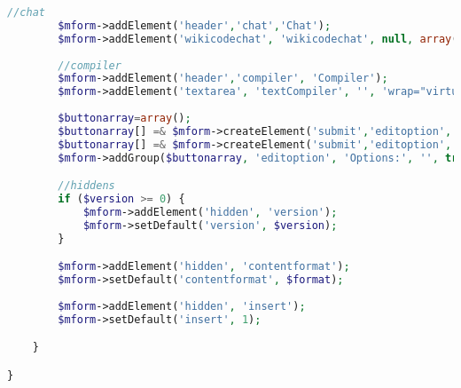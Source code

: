 \begin{lstlisting}[language=PHP]
		//chat
		$mform->addElement('header','chat','Chat');
		$mform->addElement('wikicodechat', 'wikicodechat', null, array('itemid'=>$fileitemid));
		
		//compiler
		$mform->addElement('header','compiler', 'Compiler');
		$mform->addElement('textarea', 'textCompiler', '', 'wrap="virtual" rows="3" cols="100" readonly="readonly" ');
		
		$buttonarray=array();
		$buttonarray[] =& $mform->createElement('submit','editoption','Compile', array('id' => 'compile'));
		$buttonarray[] =& $mform->createElement('submit','editoption','Download', array('id' => 'compile'));
		$mform->addGroup($buttonarray, 'editoption', 'Options:', '', true);

        //hiddens
        if ($version >= 0) {
            $mform->addElement('hidden', 'version');
            $mform->setDefault('version', $version);
        }

        $mform->addElement('hidden', 'contentformat');
        $mform->setDefault('contentformat', $format);
		
		$mform->addElement('hidden', 'insert');
		$mform->setDefault('insert', 1);

    }

}
\end{lstlisting}

